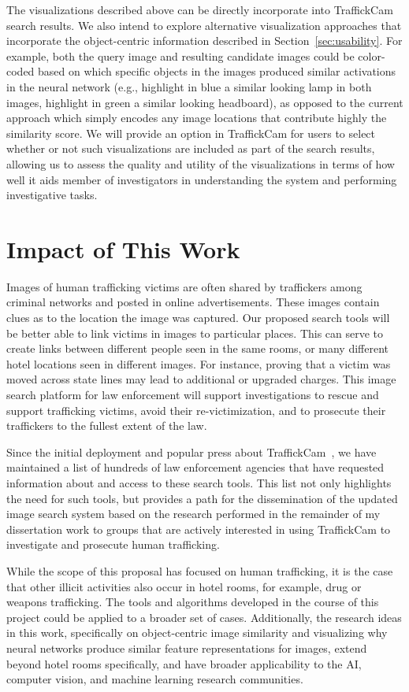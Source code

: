 \documentclass[12pt]{article}
\begin{document}
The visualizations described above can be directly incorporate into TraffickCam search results. We also intend to explore alternative visualization approaches that incorporate the object-centric information described in Section~\ref{sec:usability}. For example, both the query image and resulting candidate images could be color-coded based on which specific objects in the images produced similar activations in the neural network (e.g., highlight in blue a similar looking lamp in both images, highlight in green a similar looking headboard), as opposed to the current approach which simply encodes any image locations that contribute highly the similarity score. We will provide an option in TraffickCam for users to select whether or not such visualizations are included as part of the search results, allowing us to assess the quality and utility of the visualizations in terms of how well it aids member of investigators in understanding the system and performing investigative tasks. 

\section{Impact of This Work}
Images of human trafficking victims are often shared by traffickers among criminal networks and posted in online advertisements. These images contain clues as to the location the image was captured. Our proposed search tools will be better able to link victims in images to particular places. This can serve to create links between different people seen in the same rooms, or many different hotel locations seen in different images. For instance, proving that a victim was moved across state lines may lead to additional or upgraded charges. This image search platform for law enforcement will support investigations to rescue and support trafficking victims, avoid their re-victimization, and to prosecute their traffickers to the fullest extent of the law. 

Since the initial deployment and popular press about TraffickCam~\cite{washingtonpost,techcrunch,cnn}, we have maintained a list of hundreds of law enforcement agencies that have requested information about and access to these search tools. This list not only highlights the need for such tools, but provides a path for the dissemination of the updated image search system based on the research performed in the remainder of my dissertation work to groups that are actively interested in using TraffickCam to investigate and prosecute human trafficking.

While the scope of this proposal has focused on human trafficking, it is the case that other illicit activities also occur in hotel rooms, for example, drug or weapons trafficking. The tools and algorithms developed in the course of this project could be applied to a broader set of cases. Additionally, the research ideas in this work, specifically on object-centric image similarity and visualizing why neural networks produce similar feature representations for images, extend beyond hotel rooms specifically, and have broader applicability to the AI, computer vision, and machine learning research communities.

\singlespacing


\newpage
{} 
\end{document}
